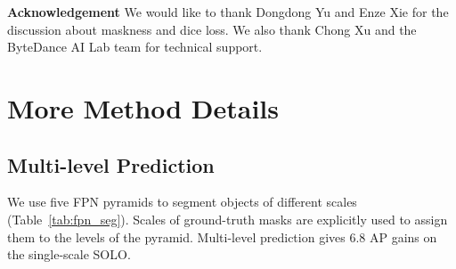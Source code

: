 \documentclass[runningheads]{llncs}
\def\OurMethod{{SOLO}\xspace}
\newcommand{\myparagraph}[1]{{ \noindent \bf #1}}
\begin{document}
\myparagraph{Acknowledgement} We would like to thank Dongdong Yu and Enze Xie for
the
discussion about
maskness and dice loss. We also thank Chong Xu and the ByteDance AI Lab team for technical support.








\clearpage

\appendix
\section{More Method Details}

\iffalse
\subsection{Alignment in Category Branch}
In the category prediction branch, we need to match the convolutional features with spatial size  to . Here, we compare three common implementations: interpolation, adaptive-pool, and region-grid-interpolation.

\begin{itemize}
    \item Interpolation: Directly bilinear interpolating to the target grid size;
    \item Adaptive-pool: Applying a 2D adaptive max-pool over  to ;
    \item Region-grid-interpolation: For each grid cell, we use bilinear interpolation conditioned on dense sample points, and aggregate the results with average.
\end{itemize}

From our observation, there is no noticeable performance gap between these variants ( 0.1AP), indicating the alignment process is fairly flexible. In all our experiments, we use the bilinear interpolation choice.
\fi

\subsection{Multi-level Prediction}
We use five FPN pyramids to segment objects of different scales (Table~\ref{tab:fpn_seg}). Scales of ground-truth masks are explicitly used to assign them to the levels of the pyramid. Multi-level prediction gives 6.8 AP gains on the single-scale \OurMethod.
\end{document}
